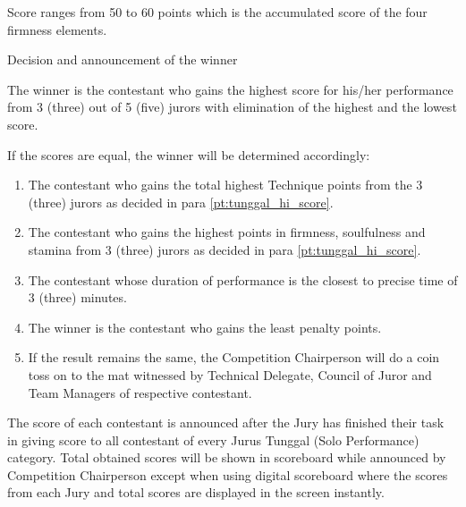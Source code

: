 \begin{legal}
\begin{legal}
\begin{legal}
        Score ranges from 50 to 60 points which is the accumulated score of the four firmness elements.
        \end{legal}

    \end{legal}

\item Decision and announcement of the winner
    \begin{legal}
    \item  \label{pt:tunggal_hi_score} The winner is the contestant who gains the highest score for his/her performance from 3 (three) out of 5 (five) jurors with elimination of the highest and the lowest score.
    \item If the scores are equal, the winner will be determined accordingly:
            \begin{enumerate}[label*=\roman*.]
            \item The contestant who gains the total highest Technique points from the 3 (three) jurors as decided in para \ref{pt:tunggal_hi_score}.
            \item The contestant who gains the highest points in firmness, soulfulness and stamina from 3 (three) jurors as decided in para \ref{pt:tunggal_hi_score}.
            \item The contestant whose duration of performance is the closest to precise time of 3 (three) minutes.
            \item The winner is the contestant who gains the least penalty points.
            \item If the result remains the same, the Competition Chairperson will do a coin toss on to the mat witnessed by Technical Delegate, Council of Juror and Team Managers of respective contestant.
            \end{enumerate}

    \item The score of each contestant is announced after the Jury has finished their task in giving score to all contestant of every Jurus Tunggal (Solo Performance) category. Total obtained scores will be shown in scoreboard while announced by Competition Chairperson except when using digital scoreboard where the scores from each Jury and total scores are displayed in the screen instantly.
    \end{legal}

\end{legal}
